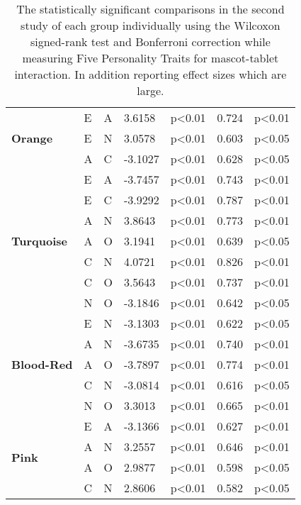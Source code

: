 \begin{table}
\begin{center}
\begin{tabular}{ |p{2cm}| p{0.5cm}|p{0.5cm}|p{1.3cm}| p{2.1cm}|p{1cm}|p{1.7cm}|  }
            \hline
            \hline
            \multirow{3}{*}{\textbf{Orange}}
            &E &A &3.6158 &p<0.01 & 0.724 &p<0.01\\
            &E &N &3.0578 &p<0.01 &0.603 &p<0.05\\
            &A &C &-3.1027 &p<0.01 & 0.628 &p<0.05\\
            \hline
            \hline
            \multirow{7}{*}{\textbf{Turquoise}}
            &E &A &-3.7457 &p<0.01 &0.743 &p<0.01\\
            &E &C &-3.9292 &p<0.01 &0.787 &p<0.01\\
            &A &N &3.8643 &p<0.01 &0.773 &p<0.01\\
            &A &O &3.1941 &p<0.01 &0.639 &p<0.05\\
            &C &N &4.0721 &p<0.01 &0.826 &p<0.01\\
            &C &O &3.5643 &p<0.01 & 0.737 &p<0.01\\
            &N &O &-3.1846 &p<0.01 & 0.642 &p<0.05\\
            \hline
            \hline
            \multirow{5}{*}{\textbf{Blood-Red}}
            &E &N &-3.1303 &p<0.01 &0.622 &p<0.05\\
            &A &N &-3.6735 &p<0.01 &0.740 &p<0.01\\
            &A &O &-3.7897 &p<0.01 &0.774 &p<0.01\\
            &C &N &-3.0814 &p<0.01 &0.616 &p<0.05\\
            &N &O &3.3013 &p<0.01 &0.665 &p<0.01\\
            \hline
            \hline
            \multirow{4}{*}{\textbf{Pink}}
            &E &A &-3.1366 &p<0.01 &0.627 &p<0.01\\
            &A &N &3.2557 &p<0.01 &0.646 &p<0.01\\
            &A &O &2.9877 &p<0.01 &0.598 &p<0.05\\
            &C &N &2.8606 &p<0.01 & 0.582 &p<0.05\\
            \hline
        \end{tabular}
    \end{center}
    \captionsetup{width=13.5cm}
    \caption{The statistically significant comparisons in the second study of each group individually using the Wilcoxon
    signed-rank test and Bonferroni correction while measuring Five Personality Traits for mascot-tablet interaction.
    In addition reporting effect sizes which are large.}
    \label{table:wilcoxMT2}
\end{table}

